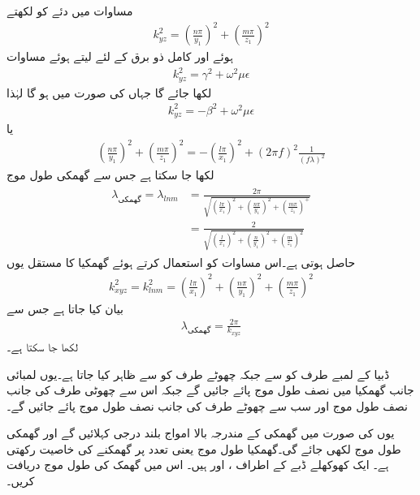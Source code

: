 مساوات  میں دئے  کو  لکھتے
\begin{align}
k_{yz}^2=\left( \frac{n \pi}{y_1}\right)^2+\left( \frac{m \pi}{z_1}\right)^2
\end{align}
ہوئے اور کامل ذو برق کے لئے  لیتے ہوئے  مساوات  
\begin{align*}
k_{yz}^2=\gamma^2+\omega^2 \mu \epsilon
\end{align*}
لکھا جائے گا جہاں  کی صورت میں  ہو گا لہٰذا
\begin{align*}
k_{yz}^2=-\beta^2+\omega^2 \mu \epsilon
\end{align*}
یا
\begin{align*}
\left( \frac{n \pi}{y_1}\right)^2+\left( \frac{m \pi}{z_1}\right)^2=-\left(\frac{l \pi}{x_1}\right)^2+\left(2\pi f\right)^2 \frac{1}{\left(f \lambda\right)^2}
\end{align*}
لکھا جا سکتا ہے جس سے گھمکی طول موج
\begin{gather}
\begin{aligned}\label{مساوات_مویج_گھمک_طول_موج}
\lambda_{\text{گھمکی}}=\lambda_{lnm}&=
\frac{2\pi}{\sqrt{\left(\frac{l \pi}{x_1}\right)^2+\left( \frac{n \pi}{y_1}\right)^2+\left( \frac{m \pi}{z_1}\right)^+}}\\
&=\frac{2}{\sqrt{\left(\frac{l}{x_1}\right)^2+\left( \frac{n }{y_1}\right)^2+\left( \frac{m}{z_1}\right)^2}}
\end{aligned}
\end{gather}
حاصل ہوتی ہے۔اس مساوات کو استعمال کرتے ہوئے گھمکیا کا مستقل  یوں
\begin{align}
k_{xyz}^2=k_{lnm}^2=\left(\frac{l \pi}{x_1}\right)^2+\left( \frac{n \pi}{y_1}\right)^2+\left( \frac{m \pi}{z_1}\right)^2
\end{align}
 بیان کیا جاتا ہے جس سے 
\begin{align}
\lambda_{\text{گھمکی}}=\frac{2\pi}{k_{xyz}}
\end{align}
لکھا جا سکتا ہے۔

ڈبیا کے  لمبے طرف کو  سے  جبکہ چھوٹے طرف کو  سے ظاہر کیا جاتا ہے۔یوں لمبائی جانب گھمکیا میں  نصف طول موج پائے جائیں گے جبکہ اس سے چھوٹی طرف کی جانب  نصف طول موج اور سب سے چھوٹے طرف کی جانب  نصف طول موج پائے جائیں گے۔

یوں  کی صورت میں گھمکی کے مندرجہ بالا امواج بلند درجی  کہلائیں گے اور گھمکی طول موج  لکھی جائے گی۔گھمکیا  طول موج یعنی  تعدد پر گھمکنے کی خاصیت رکھتی ہے۔ 
ایک کھوکھلے ڈبے کے اطراف ،  اور  ہیں۔ اس میں  گھمک کی طول موج  دریافت کریں۔

